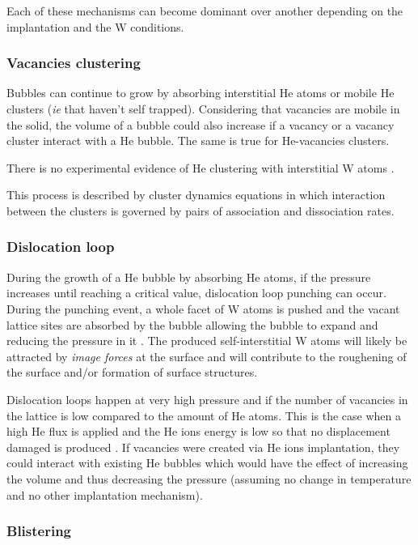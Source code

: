 Each of these mechanisms can become dominant over another depending on the implantation and the W conditions. 
\subsubsection{Vacancies clustering}

Bubbles can continue to grow by absorbing interstitial He atoms or mobile He clusters (\textit{ie} that haven't self trapped).
Considering that vacancies are mobile in the solid, the volume of a bubble could also increase if a vacancy or a vacancy cluster interact with a He bubble.
The same is true for He-vacancies clusters.

There is no experimental evidence of He clustering with interstitial W atoms \cite{faney_spatially_2014}.

This process is described by cluster dynamics equations in which interaction between the clusters is governed by pairs of association and dissociation rates.
\subsubsection{Dislocation loop}

During the growth of a He bubble by absorbing He atoms, if the pressure increases until reaching a critical value, dislocation loop punching can occur.
During the punching event, a whole facet of W atoms is pushed and the vacant lattice sites are absorbed by the bubble allowing the bubble to expand and reducing the pressure in it \cite{sefta_surface_2013}.
The produced self-interstitial W atoms will likely be attracted by \textit{image forces} at the surface and will contribute to the roughening of the surface and/or formation of surface structures.

Dislocation loops happen at very high pressure and if the number of vacancies in the lattice is low compared to the amount of He atoms.
This is the case when a high He flux is applied and the He ions energy is low so that no displacement damaged is produced \cite{sefta_surface_2013}.
If vacancies were created via He ions implantation, they could interact with existing He bubbles which would have the effect of increasing the volume and thus decreasing the pressure (assuming no change in temperature and no other implantation mechanism).

\subsubsection{Blistering}

